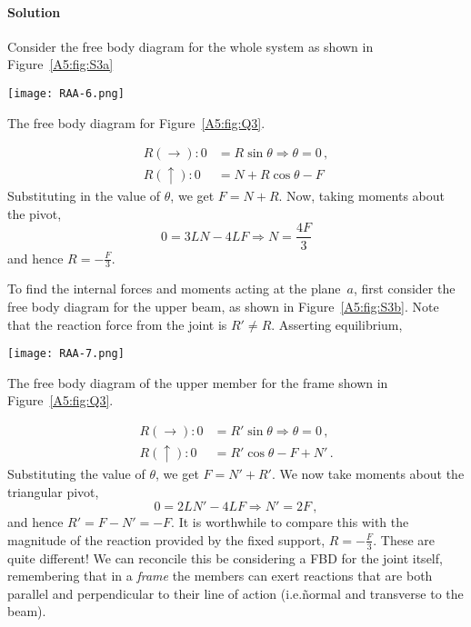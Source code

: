 \documentclass[a4paper,justified,oneside]{tufte-handout}
\numberwithin{equation}{subsection}
\begin{document}
\begin{solution}
\paragraph{Solution}
Consider the free body diagram for the whole system as shown in Figure~\ref{A5:fig:S3a}
\begin{marginfigure}
	\centering
	\texttt{[image: RAA-6.png]}
	\caption{The free body diagram for Figure~\protect\ref{A5:fig:Q3}.}
	\label{A5:fig:S3a}
\end{marginfigure}
\begin{align*}
	R\left(\rightarrow\right):	0&= R\sin\theta \Rightarrow \theta=0\,,\\
	R\left(\uparrow\right):	0&=N + R \cos\theta -F
\end{align*}
Substituting in the value of $\theta$, we get $F=N+R$. Now, taking moments about the pivot,
\begin{equation*}
	0=3LN-4LF	\Rightarrow N=\frac{4F}{3}
\end{equation*}
and hence $R=-\frac{F}{3}$.

To find the internal forces and moments acting at the plane~$a$, first consider the free body diagram for the upper beam, as shown in Figure~\ref{A5:fig:S3b}. Note that the reaction force from the joint is $R'\neq R$. Asserting equilibrium,
\begin{marginfigure}
	\centering
	\texttt{[image: RAA-7.png]}
	\caption{The free body diagram of the upper member for the frame shown in Figure~\protect\ref{A5:fig:Q3}.}
	\label{A5:fig:S3b}
\end{marginfigure}
\begin{align*}
	R\left(\rightarrow\right):	0&=R' \sin\theta \Rightarrow \theta=0	\,,\\
	R\left(\uparrow\right):	0&=R' \cos\theta - F +N'	\,.
\end{align*}
Substituting the value of $\theta$, we get $F= N'+ R'$. We now take moments about the triangular pivot,
\begin{equation*}
	0=2LN'-4LF	\Rightarrow N'=2F	\,,
\end{equation*}
and hence $R' = F- N' = -F$. It is worthwhile to compare this with the magnitude of the reaction provided by the fixed support, $R=-\frac{F}{3}$. These are quite different! We can reconcile this be considering a FBD for the joint itself, remembering that in a \emph{frame} the members can exert reactions that are both parallel and perpendicular to their line of action (i.e.\~normal and transverse to the beam).


\end{solution}
\end{document}
